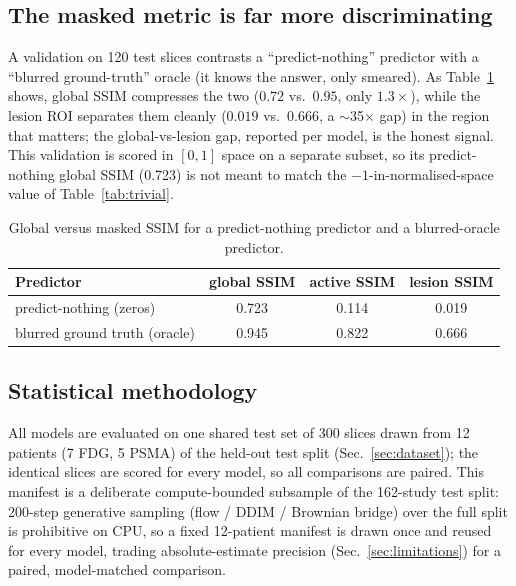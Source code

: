 \documentclass[11pt,a4paper]{article}
\newcommand{\num}[1]{#1}
\begin{document}
\subsection{The masked metric is far more discriminating}
A validation on \num{120} test slices contrasts a ``predict-nothing'' predictor with a
``blurred ground-truth'' oracle (it knows the answer, only smeared). As Table~\ref{tab:masked-validation}
shows, global SSIM compresses the two ($0.72$ vs.\ $0.95$, only $1.3\times$), while the lesion ROI
separates them cleanly ($0.019$ vs.\ $0.666$, a $\sim$35$\times$ gap) in the region that matters;
the global-vs-lesion gap, reported per model, is the honest signal. This validation is scored in
$[0,1]$ space on a separate subset, so its predict-nothing global SSIM (\num{0.723}) is not meant
to match the $-1$-in-normalised-space value of Table~\ref{tab:trivial}.

\begin{table}[h]\centering\small
\caption{Global versus masked SSIM for a predict-nothing predictor and a blurred-oracle predictor.}
\label{tab:masked-validation}
\begin{tabular}{lccc}
\toprule
Predictor & global SSIM & active SSIM & lesion SSIM \\
\midrule
predict-nothing (zeros)        & \num{0.723} & \num{0.114} & \num{0.019} \\
blurred ground truth (oracle)  & \num{0.945} & \num{0.822} & \num{0.666} \\
\bottomrule
\end{tabular}
\end{table}

\subsection{Statistical methodology}
\label{sec:stats}
All models are evaluated on one shared test set of \num{300} slices drawn from
\num{12} patients (\num{7} FDG, \num{5} PSMA) of the held-out test split
(Sec.~\ref{sec:dataset}); the identical slices are scored for every model, so all
comparisons are paired. This manifest is a deliberate compute-bounded subsample of the
\num{162}-study test split: \num{200}-step generative sampling (flow / DDIM / Brownian
bridge) over the full split is prohibitive on CPU, so a fixed \num{12}-patient manifest is
drawn once and reused for every model, trading absolute-estimate precision (Sec.~\ref{sec:limitations})
for a paired, model-matched comparison.
\end{document}
